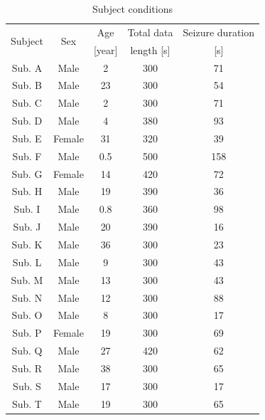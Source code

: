 \documentclass[journal]{IEEEtran}
\begin{document}
\begin{table}[t]
 \begin{center}
 \caption[Subject conditions]{Subject conditions}
 \label{table:conditions}
 \vspace{-2.5mm}
  \begin{tabular}{ccccc}
   \toprule %
   \multirow{2}{*}{Subject} &  \multirow{2}{*}{Sex} &  Age  & Total data & Seizure duration \\
   & & [year] &  length [s] & [s] \\
   \midrule %
   Sub. A & Male & 2 & 300 & 71\\ %
   Sub. B & Male & 23 & 300 & 54\\ %
   Sub. C & Male & 2 & 300 & 71\\ %
   Sub. D & Male & 4 & 380 & 93\\ %
   Sub. E & Female & 31 & 320  & 39\\ %
   Sub. F & Male & 0.5 & 500 & 158\\ %
   Sub. G & Female & 14 & 420 & 72\\ %
   Sub. H & Male & 19 & 390 & 36\\ %
   Sub. I & Male & 0.8 & 360  & 98\\ %
   Sub. J & Male & 20 & 390 & 16\\ %
   Sub. K & Male & 36 & 300 & 23\\ %
   Sub. L & Male & 9 & 300 & 43\\ %
   Sub. M & Male & 13 & 300  & 43\\ %
   Sub. N & Male & 12 & 300 & 88\\ %
   Sub. O & Male & 8 & 300 & 17\\ %
   Sub. P & Female & 19 & 300 & 69\\ %
   Sub. Q & Male & 27 & 420 & 62\\ %
	 Sub. R & Male & 38 & 300 & 65\\ %
	 Sub. S & Male & 17 & 300 & 17\\ %
	 Sub. T & Male & 19 & 300 & 65\\ %
   \bottomrule %
  \end{tabular}
 \end{center}
\end{table}

\end{document}
